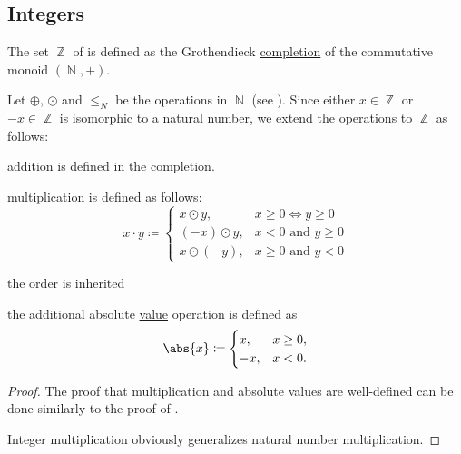 \subsection{Integers}\label{subsec:integers}

\begin{definition}\label{def:set_of_integers}
  The set \( \BbbZ \) of  is defined as the Grothendieck \hyperref[thm:monoid_completion_universal_propety]{completion} of the commutative monoid \( (\BbbN, +) \).

  Let \( \oplus \), \( \odot \) and \( \leq_N \) be the operations in \( \BbbN \) (see ). Since either \( x \in \BbbZ \) or \( -x \in \BbbZ \) is isomorphic to a natural number, we extend the operations to \( \BbbZ \) as follows:
  \begin{thmenum}
    \item addition is defined in the completion.
    \item multiplication is defined as follows:
          \begin{equation*}
            x \cdot y \coloneqq \begin{cases}
              x \odot y,    & x \geq 0 \iff y \geq 0      \\
              (-x) \odot y, & x < 0 \text{ and } y \geq 0 \\
              x \odot (-y), & x \geq 0 \text{ and } y < 0
            \end{cases}
          \end{equation*}

     the order is inherited
    \item the additional absolute \hyperref[def:absolute_value]{value} operation is defined as
          \begin{equation*}
            \abs{x} \coloneqq \begin{cases}
              x,  & x \geq 0, \\
              -x, & x < 0.
            \end{cases}
          \end{equation*}
  \end{thmenum}
\end{definition}
\begin{proof}
  The proof that multiplication and absolute values are well-defined can be done similarly to the proof of .

  Integer multiplication obviously generalizes natural number multiplication.
\end{proof}

